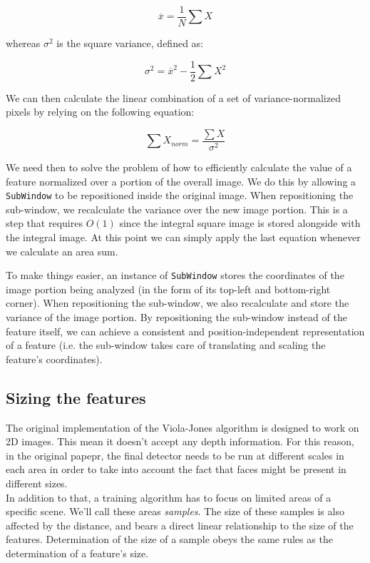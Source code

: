 \documentclass[a4paper,12pt,titlepage]{article}
\begin{document}
\[ \overline{x} = \dfrac{1}{N} \sum X \]

whereas $\sigma^{2}$ is the square variance, defined as:

\[ \sigma^{2} = \overline{x}^{2} - \dfrac{1}{2} \sum X^{2} \]

We can then calculate the linear combination of a set of variance-normalized
pixels by relying on the following equation:

\[ \sum X_{norm} = \dfrac{\sum X}{\sigma^{2}} \]

We need then to solve the problem of how to efficiently calculate the value of a
feature normalized over a portion of the overall image. We do this by allowing a
\texttt{SubWindow} to be repositioned inside the original image. When
repositioning the sub-window, we recalculate the variance over the new image
portion. This is a step that requires $O(1)$ since the integral square image is
stored alongside with the integral image. At this point we can simply apply the
last equation whenever we calculate an area sum.

To make things easier, an instance of \texttt{SubWindow} stores the coordinates
of the image portion being analyzed (in the form of its top-left and
bottom-right corner). When repositioning the sub-window, we also recalculate and
store the variance of the image portion. By repositioning the sub-window instead
of the feature itself, we can achieve a consistent and position-independent
representation of a feature (i.e. the sub-window takes care of translating and
scaling the feature's coordinates).

\subsection{Sizing the features}
The original implementation of the Viola-Jones algorithm is designed to work on
2D images. This mean it doesn't accept any depth information. For this reason,
in the original papepr, the final detector needs to be run at different scales
in each area in order to take into account the fact that faces might be present
in different sizes. \\
In addition to that, a training algorithm has to focus on limited areas of a
specific scene. We'll call these areas \emph{samples}. The size of these samples
is also affected by the distance, and bears a direct linear relationship to the
size of the features. Determination of the size of a sample obeys the same rules
as the determination of a feature's size.
\end{document}
